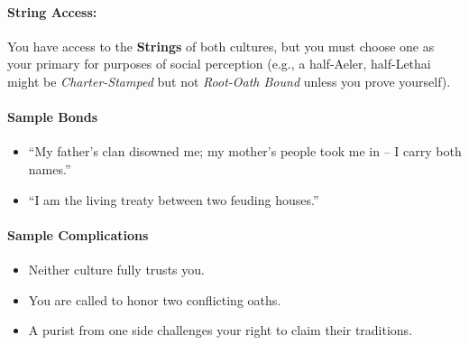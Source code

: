 \paragraph{String Access:} You have access to the \textbf{Strings} of both cultures, but you must choose one as your primary for purposes of social perception (e.g., a half-Aeler, half-Lethai might be \emph{Charter-Stamped} but not \emph{Root-Oath Bound} unless you prove yourself).

\paragraph{Sample Bonds}
\begin{itemize}
  \item ``My father's clan disowned me; my mother's people took me in -- I carry both names.''
  \item ``I am the living treaty between two feuding houses.''
\end{itemize}

\paragraph{Sample Complications}
\begin{itemize}
  \item Neither culture fully trusts you.
  \item You are called to honor two conflicting oaths.
  \item A purist from one side challenges your right to claim their traditions.
\end{itemize}